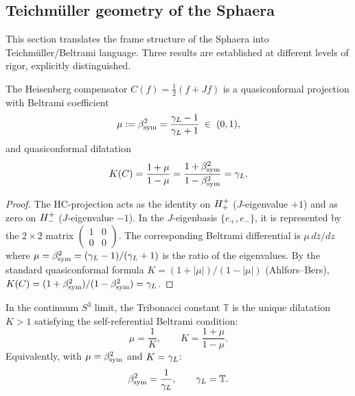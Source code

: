 \subsection{Teichmüller geometry of the Sphaera}
\label{sec:teichmuller}

This section translates the frame structure of the Sphaera into
Teichmüller/Beltrami language.
Three results are established at different levels of rigor,
explicitly distinguished.

\begin{theorem}
\label{thm:hc-quasiconformal}
The Heisenberg compensator $C(f) = \tfrac{1}{2}(f+Jf)$ is a
quasiconformal projection with Beltrami coefficient
\[
  \mu := \beta_{\mathrm{sym}}^2 = \frac{\gamma_L-1}{\gamma_L+1} \;\in\; (0,1),
\]
and quasiconformal dilatation
\[
  K(C) = \frac{1+\mu}{1-\mu} = \frac{1+\beta_{\mathrm{sym}}^2}{1-\beta_{\mathrm{sym}}^2} = \gamma_L.
\]
\end{theorem}

\begin{proof}
The HC-projection acts as the identity on $H^+_+$ ($J$-eigenvalue $+1$)
and as zero on $H^+_-$ ($J$-eigenvalue $-1$).
In the $J$-eigenbasis $\{e_+,e_-\}$, it is represented by the
$2\times 2$ matrix $\begin{pmatrix}1&0\\0&0\end{pmatrix}$.
The corresponding Beltrami differential is $\mu\,d\bar z/dz$ where
$\mu = \beta_{\mathrm{sym}}^2 = (\gamma_L-1)/(\gamma_L+1)$ is the ratio of the eigenvalues.
By the standard quasiconformal formula
$K = (1+|\mu|)/(1-|\mu|)$ (Ahlfors--Bers),
$K(C) = (1+\beta_{\mathrm{sym}}^2)/(1-\beta_{\mathrm{sym}}^2) = \gamma_L$.
\end{proof}

\begin{theorem}
\label{thm:tribonacci-beltrami}
In the continuum $S^3$ limit, the Tribonacci constant $\mathbb{T}$
is the unique dilatation $K>1$ satisfying the self-referential
Beltrami condition:
\[
  \mu = \frac{1}{K}, \qquad K = \frac{1+\mu}{1-\mu}.
\]
Equivalently, with $\mu = \beta_{\mathrm{sym}}^2$ and $K = \gamma_L$:
\[
  \beta_{\mathrm{sym}}^2 = \frac{1}{\gamma_L},
  \qquad \gamma_L = \mathbb{T}.
\]
\end{theorem}

